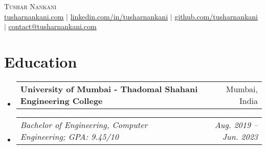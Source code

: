 \documentclass[letterpaper,10pt]{article}
\makeatletter
\newcommand{\resumeItem}[1]{
  \item\small{
    {#1 \vspace{-2pt}}
  }
}
\newcommand{\resumeSubheadingFirst}[2]{
  \vspace{-1pt}
  \item
    \begin{tabular*}{.97\textwidth}[t]{l@{\extracolsep{\fill}}r}
      \textbf{#1} & \small{#2}
    \end{tabular*}
    \vspace{-8pt}
}
\newcommand{\resumeSubheadingSecond}[2]{
  \item
    \begin{tabular*}{.97\textwidth}[t]{l@{\extracolsep{\fill}}r}
      \textit{\small#1} & \textit{\small #2}
    \end{tabular*}
    \vspace{-6pt}
}
\newcommand{\resumeSubHeadingListStart}{\begin{itemize}[leftmargin=0in, label={}]}
\newcommand{\resumeSubHeadingListEnd}{\end{itemize}}
\makeatother
\begin{document}

\begin{center}
    {\Huge \scshape Tushar Nankani} 
    \\ \vspace{4pt}
    \href{https://tusharnankani.com} 
    {tusharnankani.com}
    $|$ 
    \href{https://www.linkedin.com/in/tusharnankani} 
    {linkedin.com/in/tusharnankani}
    $|$
    \href{https://github.com/tusharnankani} 
    {github.com/tusharnankani}
    $|$ 
    \href{mailto:contact@tusharnankani.com}{contact@tusharnankani.com}  
\end{center}


\section{Education}
  \resumeSubHeadingListStart
    \resumeSubheadingFirst{University of Mumbai - Thadomal Shahani Engineering College}{Mumbai, India}
    \resumeSubheadingSecond{Bachelor of Engineering, Computer Engineering; GPA: 9.45/10}{Aug. 2019 -- Jun. 2023}
  \resumeSubHeadingListEnd


%
\end{document}
